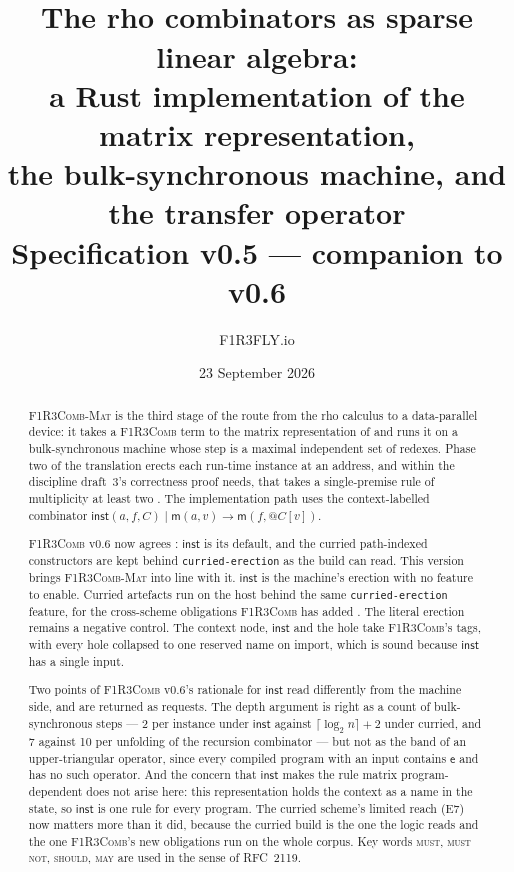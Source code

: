 \documentclass[11pt,a4paper]{article}
\title{\textbf{\Mat}\\[1mm]
\large The rho combinators as sparse linear algebra:\\
a Rust implementation of the matrix representation,\\
the bulk-synchronous machine, and the transfer operator\\[2mm]
\normalsize Specification v0.5 --- companion to \Comb{} v0.6}
\author{F1R3FLY.io}
\date{23 September 2026}
\makeatletter
\newcommand{\code}[1]{\texttt{#1}}
\newcommand{\Comb}{\textsc{F1R3Comb}}
\newcommand{\Mat}{\textsc{F1R3Comb-Mat}}
\newcommand{\MUST}{\textsc{must}}
\newcommand{\MUSTNOT}{\textsc{must not}}
\newcommand{\SHOULD}{\textsc{should}}
\newcommand{\MAY}{\textsc{may}}
\newcommand{\quo}[1]{@#1}
\newcommand{\red}{\longrightarrow}
\newcommand{\mm}{\mathsf{m}}
\newcommand{\ev}{\mathsf{e}}
\theoremstyle{definition}
\theoremstyle{plain}
\newcommand{\inst}{\mathsf{inst}}
\makeatother
\begin{document}
\maketitle

\begin{abstract}
\noindent
\Mat{} is the third stage of the route from the rho calculus to a
data-parallel device: it takes a \Comb{} term to the matrix representation of
\cite{matnote} and runs it on a bulk-synchronous machine whose step is a
maximal independent set of redexes. Phase two of the translation erects each
run-time instance at an address, and within the discipline draft~3's
correctness proof needs, that takes a single-premise rule of multiplicity at
least two \cite[Prop.~6.17, Lem.~6.19]{draft3}. The implementation path uses
the context-labelled combinator
$\inst(a,f,C) \mid \mm(a,v) \red \mm(f,\quo{C[v]})$.

\Comb{} v0.6 now agrees \cite[Dec.~5.19]{combspec}: $\inst$ is its default,
and the curried path-indexed constructors are kept behind
\code{curried-erection} as the build \cite{logic} can read. This version
brings \Mat{} into line with it. $\inst$ is the machine's erection with no
feature to enable. Curried artefacts run on the host behind the same
\code{curried-erection} feature, for the cross-scheme obligations \Comb{} has
added \cite[Obl.~11.5, Obl.~11.6]{combspec}. The literal erection remains a
negative control. The context node, $\inst$ and the hole take \Comb's tags,
with every hole collapsed to one reserved name on import, which is sound
because $\inst$ has a single input.

Two points of \Comb{} v0.6's rationale for $\inst$ read differently from the
machine side, and are returned as requests. The depth argument is right as a
count of bulk-synchronous steps --- 2 per instance under $\inst$ against
$\lceil\log_{2} n\rceil + 2$ under curried, and 7 against 10 per unfolding of
the recursion combinator --- but not as the band of an upper-triangular
operator, since every compiled program with an input contains $\ev$ and has
no such operator. And the concern that $\inst$ makes the rule matrix
program-dependent \cite[\S15, item~5]{combspec} does not arise here: this
representation holds the context as a name in the state, so $\inst$ is one
rule for every program. The curried scheme's limited reach (E7) now matters
more than it did, because the curried build is the one the logic reads and
the one \Comb's new obligations run on the whole corpus.
Key words \MUST, \MUSTNOT, \SHOULD, \MAY{} are used in the sense of RFC~2119.
\end{abstract}
\end{document}
